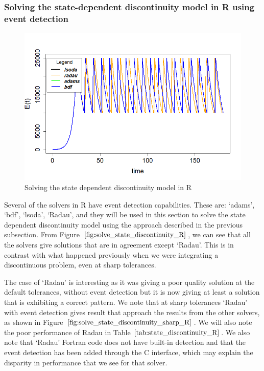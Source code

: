 \subsubsection{Solving the state-dependent discontinuity model in R using event detection}
\begin{figure}[H]
\centering
\includegraphics[width=0.7\linewidth]{./figures/solve_state_discontinuity_R}
\caption{Solving the state dependent discontinuity model in R}
\label{fig:solve_state_discontinuity_R}
\end{figure}
Several of the solvers in R have event detection capabilities. These are: `adams', `bdf', `lsoda', `Radau', and they will be used in this section to solve the state dependent discontinuity model using the approach described in the previous subsection. From Figure $\ref{fig:solve_state_discontinuity_R}$, we can see that all the solvers give solutions that are in agreement except `Radau'. This is in contrast with what happened previously when we were integrating a discontinuous problem, even at sharp tolerances. 

The case of `Radau' is interesting as it was giving a poor quality solution at the default tolerances, without event detection but it is now giving at least a solution that is exhibiting a correct pattern. We note that at sharp tolerances `Radau' with event detection gives result that approach the results from the other solvers, as shown in Figure $\ref{fig:solve_state_discontinuity_sharp_R}$. We will also note the poor performance of Radau in Table $\ref{tab:state_discontinuity_R}$. We also note that `Radau' Fortran code does not have built-in detection and that the event detection has been added through the C interface, which may explain the disparity in performance that we see for that solver.

